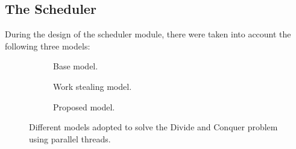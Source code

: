 \documentclass[11pt, a4paper]{article}
\begin{document}
\subsection{The Scheduler}\label{subsec:scheduler}

During the design of the scheduler module, there were taken into account the following three models:
%
\begin{figure}[b]
	\begin{subfigure}{0.33\linewidth}
		\centering
		
		\caption{Base model.}
		\label{fig:base-model}
	\end{subfigure}
	\begin{subfigure}{0.33\linewidth}
		\centering
		
		\caption{Work stealing model.}
		\label{fig:work-stealing}
	\end{subfigure}
	\begin{subfigure}{0.33\linewidth}
		\centering
		
		\caption{Proposed model.}
		\label{fig:proposed-model}
	\end{subfigure}

	\caption{Different models adopted to solve the Divide and Conquer problem using parallel threads.}
	\label{fig:models}
\end{figure}
%
\end{document}
